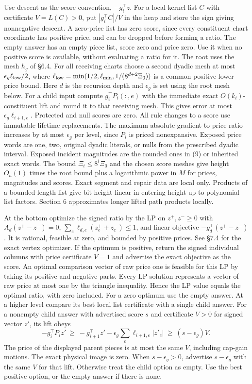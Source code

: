 \documentclass[11pt]{article}
\begin{document}
Use descent as the score convention, \(-g_i^\top z\). For a local kernel list \(C\) with certificate \(V=L(C)>0\), put \(|g_i^\top C|/V\) in the heap and store the sign giving nonnegative descent. A zero-price list has zero score, since every constituent chart coordinate has positive price, and can be dropped before forming a ratio. The empty answer has an empty piece list, score zero and price zero. Use it when no positive score is available, without evaluating a ratio for it. The root uses the mesh \(h_g\) of §6.4. For all receiving charts choose a second dyadic mesh at most \(\epsilon_g\ell_{\rm low}/2\), where \(\ell_{\rm low}=\min(1/2,\ell_{\min},1/(8^{d+2}\Xi_0))\) is a common positive lower price bound. Here \(d\) is the recursion depth and \(\epsilon_g\) is set using the root mesh below. For a child input compute \(g_i^\top P_i(:,e)\) with the immediate exact \(O(k_i)\)-constituent lift and round it to that receiving mesh. This gives error at most \(\epsilon_g\ell_{i+1,e}\). Protected and null scores are zero. All rule changes to a score use immutable lifetime replacements. The maximum absolute gradient-to-price ratio increases by at most \(\epsilon_g\) per level, since \(P_i\) is priced nonexpansive. Exposed price words are one, two, original dyadic literals, or nulls from the prescribed dyadic interval. Exposed incident magnitudes are the rounded ones in (9) or inherited exact words. The bound \(\Xi_i\le8^i\Xi_0\) and the chosen score meshes give height \(O_a(1)\) times the root bound plus a logarithmic power in \(M\) for prices, magnitudes and scores. Exact segment and repair data are local only. Products of a bounded-length list give bit height linear in entering height up to polynomial list factors. Section 6 approximates longer lifted path products locally.

At the bottom optimize the signed ratio by the LP on \(z^+,z^-\ge0\) with \(A_d(z^+-z^-)=0\), \(\sum_e\ell_{d,e}(z^+_e+z^-_e)\le1\), and linear objective \(-g_d^\top(z^+-z^-)\). It is rational, feasible at zero, and bounded by positive prices. See §7.4 for the exact vertex optimizer. If the optimum is positive, return the signed individual columns with price certificate \(V=1\) and advertise the exact objective as the score. An optimal comparison vector of raw price one is feasible for this LP by taking its positive and negative parts. Every LP solution represents a vector of raw price at most one by the triangle inequality. Hence the LP value equals the optimal ratio, with zero included. For a zero optimum use the empty answer. At a higher level compare its best local list certificate with a single child answer. For a nonempty child answer with advertised score \(s\) and certificate \(V>0\) for signed vector \(z'\), its lift obeys
\[
  -g_i^\top P_i z'\ \ge\ -g_{i+1}^\top z'-\epsilon_g\sum_e\ell_{i+1,e}|z'_e|
  \ \ge\ (s-\epsilon_g)V .
\]
The price of the displayed parent pieces is at most the same \(V\), including cap-gain motions. The exact physical image is zero. When \(s-\epsilon_g>0\), advertise \(s-\epsilon_g\) with the same \(V\) for that lift. Otherwise treat the child option as empty. Use the best positive option, or the empty answer if there is none.
\end{document}
